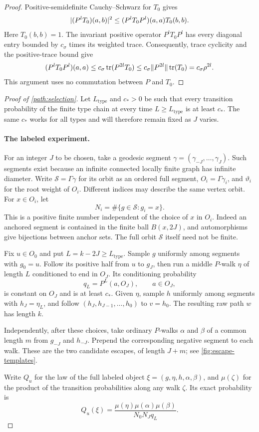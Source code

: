 \begin{proof}
Positive-semidefinite Cauchy--Schwarz for $T_0$ gives
\[
 \lvert(P^lT_0)(a,b)\rvert^2
 \le (P^lT_0P^l)(a,a)T_0(b,b).
\]
Here $T_0(b,b)=1$. The invariant positive operator $P^lT_0P^l$ has
every diagonal entry bounded by $c_\sigma$ times its weighted trace.
Consequently, trace cyclicity and the positive-trace bound give
\[
 (P^lT_0P^l)(a,a)
 \le c_\sigma\operatorname{tr}(P^{2l}T_0)
 \le c_\sigma\lVert P^{2l}\rVert\operatorname{tr}(T_0)
 =c_\sigma\rho^{2l}.
\]
This argument uses no commutation between $P$ and $T_0$.
\end{proof}

\begin{proof}[Proof of \cref{path:selection}]
Let $L_{\mathrm{type}}$ and $c_*>0$ be such that every transition
probability of the finite type chain at every time $L\ge
L_{\mathrm{type}}$ is at least $c_*$. The same $c_*$ works for all
types and will therefore remain fixed as $J$ varies.

\paragraph{The labeled experiment.}
For an integer $J$ to be chosen, take a geodesic segment
$\gamma=(\gamma_{-J},\ldots,\gamma_J)$. Such segments exist because an
infinite connected locally finite graph has infinite diameter. Write
$\mathcal S=\Gamma\gamma$ for its orbit as an ordered full segment,
$O_i=\Gamma\gamma_i$, and $\vartheta_i$ for the root weight of $O_i$.
Different indices may describe the same vertex orbit. For $x\in O_i$,
let
\[
 N_i=\#\{g\in\mathcal S:g_i=x\}.
\]
This is a positive finite number independent of the choice of $x$ in
$O_i$. Indeed an anchored segment is contained in the finite ball
$B(x,2J)$, and automorphisms give bijections between anchor sets.
The full orbit $\mathcal S$ itself need not be finite.

Fix $u\in O_0$ and put $L=k-2J\ge L_{\mathrm{type}}$. Sample $g$
uniformly among segments with $g_0=u$. Follow its positive half from
$u$ to $g_J$, then run a middle $P$-walk $\eta$ of length $L$ conditioned
to end in $O_J$. Its conditioning probability
\[
 q_L=P^L(a,O_J),\qquad a\in O_J,
\]
is constant on $O_J$ and is at least $c_*$. Given $\eta$, sample $h$
uniformly among segments with $h_J=\eta_L$, and follow
$(h_J,h_{J-1},\ldots,h_0)$ to $v=h_0$. The resulting raw path $w$ has
length $k$.

Independently, after these choices, take ordinary $P$-walks $\alpha$
and $\beta$ of a common length $m$ from $g_{-J}$ and $h_{-J}$.
Prepend the corresponding negative segment to each walk. These are the
two candidate escapes, of length $J+m$; see
\cref{fig:escape-templates}.

Write $Q_u$ for the law of the
full labeled object $\xi=(g,\eta,h,\alpha,\beta)$, and $\mu(\zeta)$
for the product of the transition probabilities along any walk $\zeta$.
Its exact probability is
\begin{equation}
 Q_u(\xi)=
 \frac{\mu(\eta)\mu(\alpha)\mu(\beta)}{N_0N_Jq_L}.
 \label{path:labeled-weight}
\end{equation}


\end{proof}
